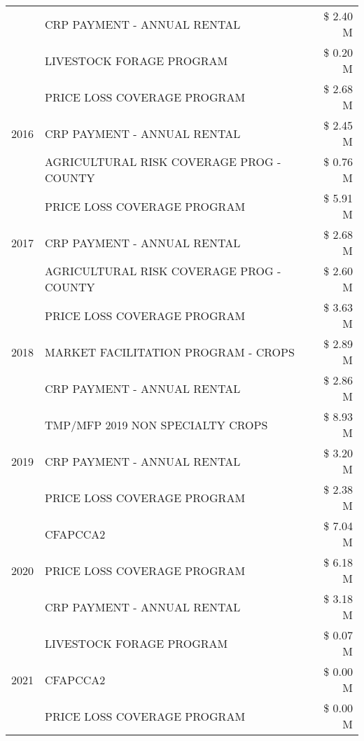 \begin{tabular}{llr}
 & CRP PAYMENT - ANNUAL RENTAL & \$ 2.40 M \\
 & LIVESTOCK FORAGE PROGRAM & \$ 0.20 M \\
\cline{1-3}
\multirow[t]{3}{*}{2016} & PRICE LOSS COVERAGE PROGRAM & \$ 2.68 M \\
 & CRP PAYMENT - ANNUAL RENTAL & \$ 2.45 M \\
 & AGRICULTURAL RISK COVERAGE PROG - COUNTY & \$ 0.76 M \\
\cline{1-3}
\multirow[t]{3}{*}{2017} & PRICE LOSS COVERAGE PROGRAM & \$ 5.91 M \\
 & CRP PAYMENT - ANNUAL RENTAL & \$ 2.68 M \\
 & AGRICULTURAL RISK COVERAGE PROG - COUNTY & \$ 2.60 M \\
\cline{1-3}
\multirow[t]{3}{*}{2018} & PRICE LOSS COVERAGE PROGRAM & \$ 3.63 M \\
 & MARKET FACILITATION PROGRAM - CROPS & \$ 2.89 M \\
 & CRP PAYMENT - ANNUAL RENTAL & \$ 2.86 M \\
\cline{1-3}
\multirow[t]{3}{*}{2019} & TMP/MFP 2019 NON SPECIALTY CROPS & \$ 8.93 M \\
 & CRP PAYMENT - ANNUAL RENTAL & \$ 3.20 M \\
 & PRICE LOSS COVERAGE PROGRAM & \$ 2.38 M \\
\cline{1-3}
\multirow[t]{3}{*}{2020} & CFAPCCA2 & \$ 7.04 M \\
 & PRICE LOSS COVERAGE PROGRAM & \$ 6.18 M \\
 & CRP PAYMENT - ANNUAL RENTAL & \$ 3.18 M \\
\cline{1-3}
\multirow[t]{3}{*}{2021} & LIVESTOCK FORAGE PROGRAM & \$ 0.07 M \\
 & CFAPCCA2 & \$ 0.00 M \\
 & PRICE LOSS COVERAGE PROGRAM & \$ 0.00 M \\
\cline{1-3}
\bottomrule
\end{tabular}

